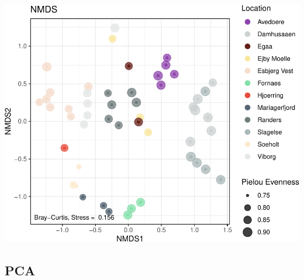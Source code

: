 \documentclass[
]{book}
\begin{document}
\includegraphics{gitbook-demo_files/figure-latex/nmds-1.pdf}

\hypertarget{pca}{%
\subsection{PCA}\label{pca}}
\end{document}
